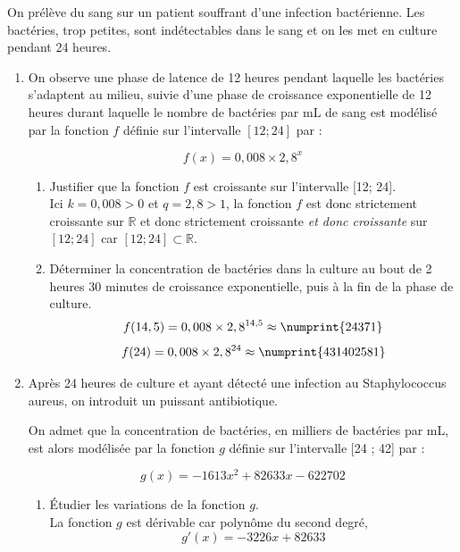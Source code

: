 \documentclass[french]{book}
\begin{document}
\begin{corrige}
On prélève du sang sur un patient souffrant d'une infection bactérienne. Les bactéries, trop petites, sont indétectables dans le sang et on les met en culture pendant 24 heures.

\begin{enumerate}
\item On observe une phase de latence de 12 heures pendant laquelle les bactéries s'adaptent au milieu, suivie d'une phase de croissance exponentielle de 12 heures durant laquelle le nombre de bactéries par $\mathrm{mL}$ de sang est modélisé par la fonction $f$ définie sur l'intervalle $[12 ; 24]$ par :

$$
f(x)=0,008 \times 2,8^{x}
$$

\begin{enumerate}
\item Justifier que la fonction $f$ est croissante sur l'intervalle [12; 24].\\

Ici $k=0,008>0$ et $q=2,8>1$, la fonction $f$ est donc strictement croissante sur $\mathbb{R}$ et donc strictement croissante \textit{et donc croissante} sur $[12;24]$ car $[12;24] \subset \mathbb{R}$.

\item Déterminer la concentration de bactéries dans la culture au bout de 2 heures $30$ minutes de croissance exponentielle, puis à la fin de la phase de culture.\\

$$f(14,5)=0,008 \times 2,8^{14,5}\approx \numprint{24371} $$
$$f(24)=0,008 \times 2,8^{24} \approx \numprint{431402581}$$

\end{enumerate}

\item Après 24 heures de culture et ayant détecté une infection au Staphylococcus aureus, on introduit un puissant antibiotique.

On admet que la concentration de bactéries, en milliers de bactéries par mL, est alors modélisée par la fonction $g$ définie sur l'intervalle [24 ; 42] par :

$$
g(x)=-1613 x^{2}+82633 x-622702
$$

\begin{enumerate}
\item Étudier les variations de la fonction $g$.\\

La fonction $g$ est dérivable car polynôme du second degré, 
$$g'(x)=-3226x+82633$$


\end{enumerate}
\end{enumerate}
\end{corrige}
\end{document}
